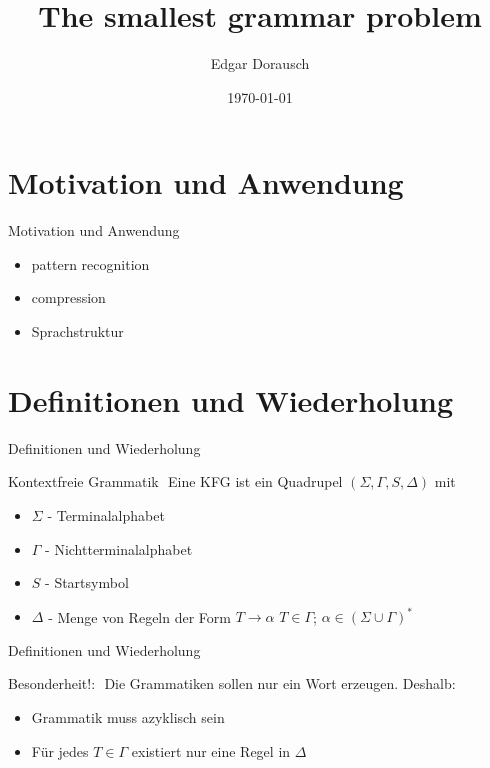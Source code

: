 \documentclass{beamer}
\title{The smallest grammar problem}
\date{\today}
\author{Edgar Dorausch}
\begin{document}
\maketitle




\section{Motivation und Anwendung}

\begin{frame}{Motivation und Anwendung}
	\begin{itemize}[<+->]
		\item pattern recognition
		\item compression
		\item Sprachstruktur
	\end{itemize}
\end{frame}

\section{Definitionen und Wiederholung}
\begin{frame}{Definitionen und Wiederholung}
	\begin{block}{Kontextfreie Grammatik}
		$ $ \linebreak
		Eine KFG ist ein Quadrupel $(\Sigma,\Gamma,S,\Delta)$ mit
		\begin{itemize}
			\item $\Sigma$ - Terminalalphabet
			\item $\Gamma$ - Nichtterminalalphabet
			\item $S$ - Startsymbol
			\item $\Delta$ - Menge von Regeln der Form $T\rightarrow\alpha$\linebreak
			$T \in \Gamma$;
			$\alpha \in (\Sigma \cup \Gamma)^\ast$
		\end{itemize}
	\end{block}
	
\end{frame}

\begin{frame}{Definitionen und Wiederholung}
\begin{alert}{Besonderheit!:}
	$ $ \linebreak
	Die Grammatiken sollen nur ein Wort erzeugen. Deshalb:
	\begin{itemize}
		
		\item Grammatik muss azyklisch sein
		\item Für jedes $T \in \Gamma$ existiert nur eine Regel in $\Delta$
	\end{itemize}
\end{alert}
\end{frame}
\end{document}
